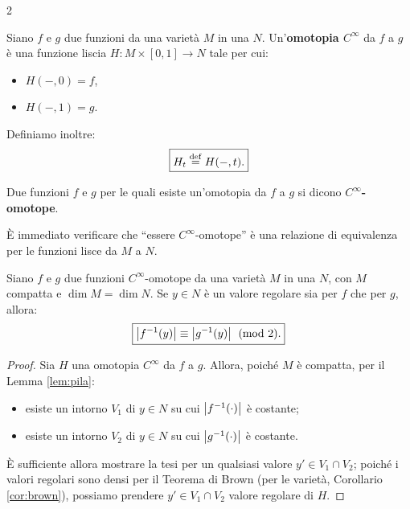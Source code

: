 \begin{multicols*}{2}
    \begin{definition}
        Siano $f$ e $g$ due funzioni da una varietà $M$ in una $N$.
        Un'\textbf{omotopia $C^\infty$} da $f$ a $g$ è una funzione liscia
        $H : M \times [0, 1] \to N$ tale per cui:
        \begin{itemize}
            \item $H(-, 0) = f$,
            \item $H(-, 1) = g$.
        \end{itemize}
        Definiamo inoltre:
        \[
            \boxed{H_t \overset{\mathrm{def}}{=} H(-, t).}
        \]

        Due funzioni $f$ e $g$ per le quali esiste un'omotopia
        da $f$ a $g$ si dicono \textbf{$C^\infty$-omotope}.
    \end{definition}

    \begin{remark}
        È immediato verificare che ``essere $C^\infty$-omotope'' è una
        relazione di equivalenza per le funzioni lisce da $M$ a $N$.
    \end{remark}

    \begin{lemma}[di omotopia] \label{lem:omotopia}
        Siano $f$ e $g$ due funzioni $C^\infty$-omotope da una varietà $M$ in una $N$,
        con $M$ compatta e $\dim M = \dim N$. Se
        $y \in N$ è un valore regolare sia per $f$ che per $g$, allora:
        \[
            \boxed{\left\lvert f^{-1}(y) \right\rvert \equiv \left\lvert g^{-1}(y) \right\rvert \pmod{2}.}
        \]
    \end{lemma}

    \begin{proof}
        Sia $H$ una omotopia $C^\infty$ da $f$ a $g$. Allora, poiché $M$ è compatta,
        per il Lemma \ref{lem:pila}:
        \begin{itemize}
            \item esiste un intorno $V_1$ di $y \in N$ su cui $\left\lvert f^{-1}(\cdot) \right\rvert$ è costante;
            \item esiste un intorno $V_2$ di $y \in N$ su cui $\left\lvert g^{-1}(\cdot) \right\rvert$ è costante.
        \end{itemize}
        È sufficiente allora mostrare la tesi per un qualsiasi valore $y' \in V_1 \cap V_2$;
        poiché i valori regolari sono densi per il Teorema di Brown (per le varietà, Corollario \ref{cor:brown}),
        possiamo prendere $y' \in V_1 \cap V_2$ valore regolare di $H$. \smallskip


\end{proof}
\end{multicols*}
